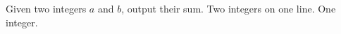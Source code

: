 Given two integers $a$ and $b$, output their sum.
\InputFile
Two integers on one line.
\OutputFile
One integer.
